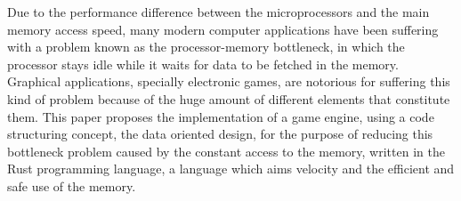 Due to the performance difference between the microprocessors and the main memory access 
speed, many modern computer applications have been suffering with a problem known as 
the processor-memory bottleneck, in which the processor stays idle while it waits for 
data to be fetched in the memory. Graphical applications, specially electronic games, are 
notorious for suffering this kind of problem because of the huge amount of different 
elements that constitute them. This paper proposes the implementation of a game engine, 
using a code structuring concept, the data oriented design, for the purpose of reducing
this bottleneck problem caused by the constant access to the memory, written in the Rust 
programming language, a language which aims velocity and the efficient and safe use of 
the memory.
